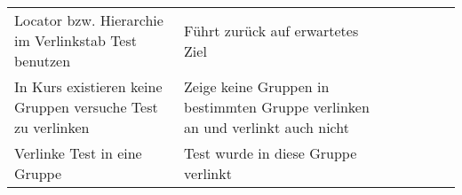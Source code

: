 \begin{table}[]
\begin{tabular}{p{6cm}p{7cm}p{3cm}llll}
		Locator bzw. Hierarchie im Verlinkstab Test benutzen                                                                                 & Führt zurück auf erwartetes Ziel                                                                                                                                 & \checkmark           &  &  &  \\
		In Kurs existieren keine Gruppen versuche Test zu verlinken                                                                          & Zeige keine Gruppen in bestimmten Gruppe verlinken an und verlinkt auch nicht                                                                                    & \checkmark           &  &  &  \\
		Verlinke Test in eine Gruppe                                                                                                         & Test wurde in diese Gruppe verlinkt                                                                                                                              & \checkmark           &  &  &  \\
	
	\end{tabular}
\end{table}


